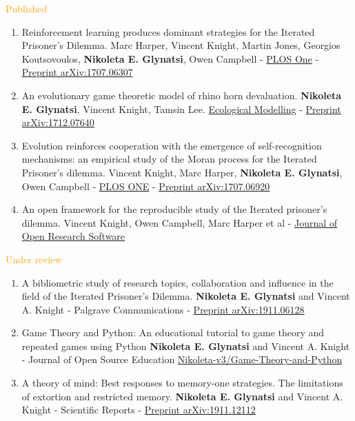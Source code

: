 \documentclass{beamer}
\begin{document}
\begin{frame}
    \footnotesize{\textcolor{orange}{Published}}
    \tiny{
    \begin{enumerate}
    \def\labelenumi{\arabic{enumi}.}
    \item
    Reinforcement learning produces dominant strategies for
    the Iterated Prisoner's Dilemma. Marc Harper, Vincent Knight, Martin
    Jones, Georgios Koutsovoulos, \textbf{Nikoleta E. Glynatsi}, Owen Campbell -
    \href{https://journals.plos.org/plosone/article?id=10.1371/journal.pone.0188046}{PLOS
    One} -
    \href{https://arxiv.org/abs/1707.06307}{Preprint arXiv:1707.06307}
    \item
    An evolutionary game theoretic model of rhino horn
    devaluation. \textbf{Nikoleta E. Glynatsi}, Vincent Knight, Tamsin Lee.
    \href{https://www.sciencedirect.com/science/article/pii/S0304380018303260}{Ecological
    Modelling} -
    \href{https://arxiv.org/abs/1712.07640}{Preprint arXiv:1712.07640}
    \item
    Evolution reinforces cooperation with the emergence of
    self-recognition mechanisms: an empirical study of the Moran process
    for the Iterated Prisoner's dilemma. Vincent Knight, Marc Harper,
    \textbf{Nikoleta E. Glynatsi}, Owen Campbell -
    \href{https://journals.plos.org/plosone/article/comments?id=10.1371/journal.pone.0204981}{PLOS
    ONE} -
    \href{https://arxiv.org/abs/1707.06920}{Preprint arXiv:1707.06920}
    \item
    An open framework for the reproducible study of the
    Iterated prisoner's dilemma. Vincent Knight, Owen Campbell, Marc
    Harper et al -
    \href{https://openresearchsoftware.metajnl.com/articles/10.5334/jors.125/}{Journal
    of Open Research Software}
    \end{enumerate}
    }
    
    \footnotesize{\textcolor{orange}{Under review}}
    \tiny{
    \begin{enumerate} \def\labelenumi{\arabic{enumi}.}
        \item A bibliometric study of research topics, collaboration and influence in the field of the Iterated Prisoner's Dilemma.
        \textbf{Nikoleta E. Glynatsi} and Vincent A. Knight -
        Palgrave Communications - \href{https://arxiv.org/abs/1911.12112}{Preprint arXiv:1911.06128}
        \item Game Theory and Python: An educational tutorial to game
        theory and repeated games using Python \textbf{Nikoleta E. Glynatsi} and Vincent A. Knight -
        Journal of Open Source Education
        \href{https://github.com/Nikoleta-v3/Game-Theory-and-Python}{Nikoleta-v3/Game-Theory-and-Python}
        \item A theory of mind: Best responses to memory-one strategies.
        The limitations of extortion and restricted memory. \textbf{Nikoleta E. Glynatsi} and Vincent A. Knight -
        Scientific Reports -
        \href{https://arxiv.org/abs/1911.12112}{Preprint arXiv:1911.12112}
    \end{enumerate}
    }
    

\end{frame}
\end{document}
